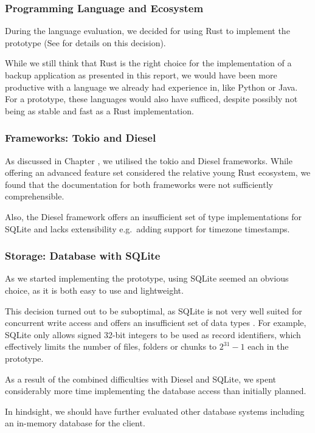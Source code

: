 \subsubsection{Programming Language and Ecosystem}
During the language evaluation, we decided for using Rust to implement the prototype (See  for details on this decision).

While we still think that Rust is the right choice for the implementation of a backup application as presented in this report, we would have been more productive with a language we already had experience in, like Python or Java. For a prototype, these languages would also have sufficed, despite possibly not being as stable and fast as a Rust implementation.

\subsubsection{Frameworks: Tokio and Diesel}
As discussed in Chapter , we utilised the tokio and Diesel frameworks. While offering an advanced feature set considered the relative young Rust ecosystem, we found that the documentation for both frameworks were not sufficiently comprehensible.

Also, the Diesel framework offers an insufficient set of type implementations for SQLite and lacks extensibility e.g.~adding support for timezone timestamps.

\subsubsection{Storage: Database with SQLite}
As we started implementing the prototype, using SQLite seemed an obvious choice, as it is both easy to use and lightweight.

This decision turned out to be suboptimal, as SQLite is not very well suited for concurrent write access \cite{sqlite-locking} and offers an insufficient set of data types \cite{sqlite-datatypes}. For example, SQLite only allows signed 32-bit integers to be used as record identifiers, which effectively limits the number of \glspl{file}, folders or \glspl{chunk} to $2^{31}-1$ each in the prototype.

As a result of the combined difficulties with Diesel and SQLite, we spent considerably more time implementing the database access than initially planned.

In hindsight, we should have further evaluated other database systems including an in-memory database for the \gls{client}.

